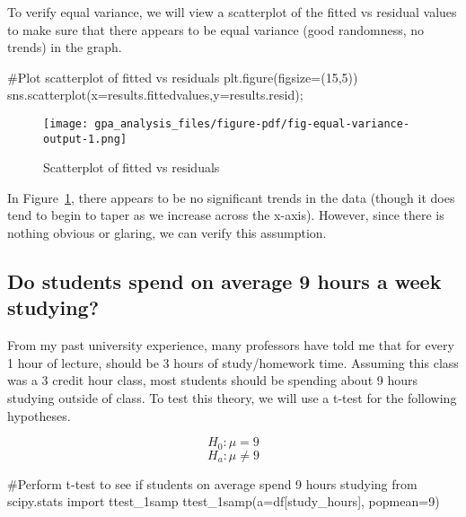 \documentclass[
  letterpaper,
  DIV=11,
  numbers=noendperiod]{scrreprt}
\newenvironment{Shaded}{\begin{snugshade}}{\end{snugshade}}
\newcommand{\CommentTok}[1]{\textcolor[rgb]{0.37,0.37,0.37}{#1}}
\newcommand{\DecValTok}[1]{\textcolor[rgb]{0.68,0.00,0.00}{#1}}
\newcommand{\ImportTok}[1]{\textcolor[rgb]{0.00,0.46,0.62}{#1}}
\newcommand{\NormalTok}[1]{\textcolor[rgb]{0.00,0.23,0.31}{#1}}
\newcommand{\OperatorTok}[1]{\textcolor[rgb]{0.37,0.37,0.37}{#1}}
\newcommand{\StringTok}[1]{\textcolor[rgb]{0.13,0.47,0.30}{#1}}
\begin{document}
To verify equal variance, we will view a scatterplot of the fitted vs
residual values to make sure that there appears to be equal variance
(good randomness, no trends) in the graph.

\begin{Shaded}
\begin{Highlighting}[]
\CommentTok{\#Plot scatterplot of fitted vs residuals}
\NormalTok{plt.figure(figsize}\OperatorTok{=}\NormalTok{(}\DecValTok{15}\NormalTok{,}\DecValTok{5}\NormalTok{))}
\NormalTok{sns.scatterplot(x}\OperatorTok{=}\NormalTok{results.fittedvalues,y}\OperatorTok{=}\NormalTok{results.resid)}\OperatorTok{;}
\end{Highlighting}
\end{Shaded}

\begin{figure}[H]

{\centering \texttt{[image: gpa\_analysis\_files/figure-pdf/fig-equal-variance-output-1.png]}

}

\caption{\label{fig-equal-variance}Scatterplot of fitted vs residuals}

\end{figure}

In Figure~\ref{fig-equal-variance}, there appears to be no significant
trends in the data (though it does tend to begin to taper as we increase
across the x-axis). However, since there is nothing obvious or glaring,
we can verify this assumption.

\hypertarget{do-students-spend-on-average-9-hours-a-week-studying}{%
\subsection{Do students spend on average 9 hours a week
studying?}\label{do-students-spend-on-average-9-hours-a-week-studying}}

From my past university experience, many professors have told me that
for every 1 hour of lecture, should be 3 hours of study/homework time.
Assuming this class was a 3 credit hour class, most students should be
spending about 9 hours studying outside of class. To test this theory,
we will use a t-test for the following hypotheses.

\[H_0: \mu = 9\] \[H_a: \mu \neq 9\]

\begin{Shaded}
\begin{Highlighting}[]
\CommentTok{\#Perform t{-}test to see if students on average spend 9 hours studying}
\ImportTok{from}\NormalTok{ scipy.stats }\ImportTok{import}\NormalTok{ ttest\_1samp}
\NormalTok{ttest\_1samp(a}\OperatorTok{=}\NormalTok{df[}\StringTok{\textquotesingle{}study\_hours\textquotesingle{}}\NormalTok{], popmean}\OperatorTok{=}\DecValTok{9}\NormalTok{)}
\end{Highlighting}
\end{Shaded}
\end{document}
